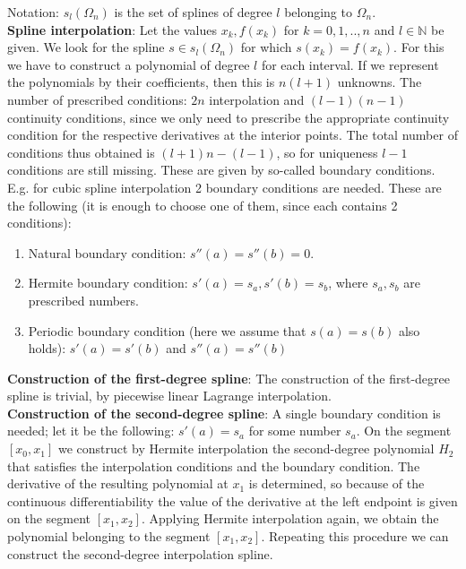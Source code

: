 \documentclass[margin=0px]{article}
\begin{document}
\noindent Notation: $s_{l}(\Omega_{n})$ is the set of splines of degree $l$ belonging to $\Omega_{n}$.\\

\noindent \textbf{Spline interpolation}: Let the values $x_{k},f(x_{k})$ for $k=0,1,..,n$ and $l \in \mathbb{N}$ be given.
We look for the spline $s \in s_{l}(\Omega_{n})$ for which $s(x_{k}) = f(x_{k})$. For this we have to construct a
polynomial of degree $l$ for each interval. If we represent the polynomials by their coefficients, then this is $n(l+1)$ unknowns.
The number of prescribed conditions: $2n$ interpolation and $(l-1)(n-1)$ continuity conditions, since we only need to prescribe
the appropriate continuity condition for the respective derivatives at the interior points. The total number of conditions thus obtained
is $(l+1)n - (l-1)$, so for uniqueness $l-1$ conditions are still missing. These are given by so-called boundary conditions.
E.g. for cubic spline interpolation 2 boundary conditions are needed. These are the following (it is enough to choose one of them,
since each contains 2 conditions):

\begin{enumerate}
    \item	Natural boundary condition: $s''(a) = s''(b) = 0$.

    \item	Hermite boundary condition: $s'(a) = s_{a}, s'(b) = s_{b}$, where $s_{a}, s_{b}$ are prescribed numbers.

    \item	Periodic boundary condition (here we assume that $s(a) = s(b)$ also holds):
          $s'(a) = s'(b)$ and $s''(a) = s''(b)$
\end{enumerate}

\noindent \textbf{Construction of the first-degree spline}: The construction of the first-degree spline is trivial, by piecewise
linear Lagrange interpolation.\\

\noindent \textbf{Construction of the second-degree spline}: A single boundary condition is needed; let it be the following: $s'(a) = s_{a}$
for some number $s_{a}$. On the segment $[x_{0},x_{1}]$ we construct by Hermite interpolation the second-degree polynomial $H_{2}$
that satisfies the interpolation conditions and the boundary condition. The derivative of the resulting polynomial at $x_{1}$
is determined, so because of the continuous differentiability the value of the derivative at the left endpoint is given on the segment
$[x_{1},x_{2}]$. Applying Hermite interpolation again, we obtain the polynomial belonging to the segment $[x_{1},x_{2}]$.
Repeating this procedure we can construct the second-degree interpolation spline.\\
\end{document}
